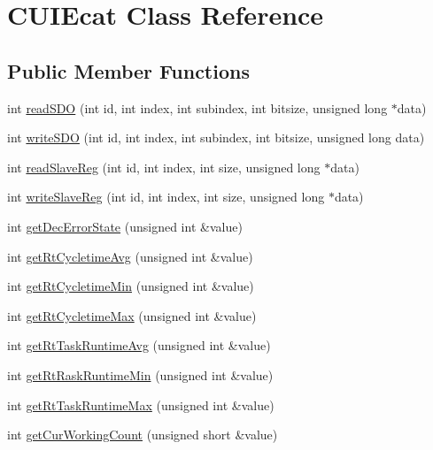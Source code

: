 \hypertarget{classCUIEcat}{\section{C\-U\-I\-Ecat Class Reference}
\label{classCUIEcat}
}
\subsection*{Public Member Functions}
\begin{DoxyCompactItemize}
\item 
int \hyperlink{classCUIEcat_a0f9a34ad0eb93fd5b5b508d23b478421}{read\-S\-D\-O} (int id, int index, int subindex, int bitsize, unsigned long $\ast$data)
\item 
int \hyperlink{classCUIEcat_a51e333dd134e6bd3ffacccc8b4dbf93c}{write\-S\-D\-O} (int id, int index, int subindex, int bitsize, unsigned long data)
\item 
int \hyperlink{classCUIEcat_a57b81ecc655ceceba421a89ac222edd2}{read\-Slave\-Reg} (int id, int index, int size, unsigned long $\ast$data)
\item 
int \hyperlink{classCUIEcat_a93785c42e09080da572de2ec958c827f}{write\-Slave\-Reg} (int id, int index, int size, unsigned long $\ast$data)
\item 
int \hyperlink{classCUIEcat_a7624c834deca3243eda90c269d22c663}{get\-Dec\-Error\-State} (unsigned int \&value)
\item 
int \hyperlink{classCUIEcat_ab62988589c529181b1b9716910d6e66a}{get\-Rt\-Cycletime\-Avg} (unsigned int \&value)
\item 
int \hyperlink{classCUIEcat_aee10d1bfa0042f7f7eed3fb799353643}{get\-Rt\-Cycletime\-Min} (unsigned int \&value)
\item 
int \hyperlink{classCUIEcat_af6d43ab5430d66093cec76234055baa7}{get\-Rt\-Cycletime\-Max} (unsigned int \&value)
\item 
int \hyperlink{classCUIEcat_adeb5b823fd182c274bcac03a9cfae560}{get\-Rt\-Task\-Runtime\-Avg} (unsigned int \&value)
\item 
int \hyperlink{classCUIEcat_a563eabb48053cfa9ec88213b96914179}{get\-Rt\-Rask\-Runtime\-Min} (unsigned int \&value)
\item 
int \hyperlink{classCUIEcat_a49de2bbe30a82bd57c5c3ce86234fece}{get\-Rt\-Task\-Runtime\-Max} (unsigned int \&value)
\item 
int \hyperlink{classCUIEcat_aab8856e80c8cfcee4cb007d4adba10e6}{get\-Cur\-Working\-Count} (unsigned short \&value)
\item 

\end{DoxyCompactItemize}
